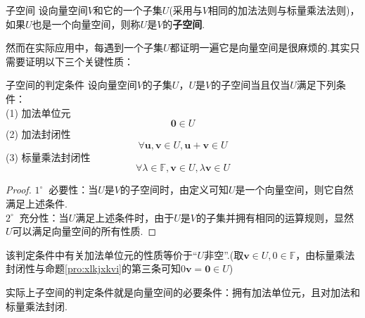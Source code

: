 \documentclass[lang=cn, zihao=5]{elegantbook}
\newcommand{\F}{\mathbb{F}}
\newcommand{\buzhou}[1]{$#1^{\circ} \ $}
\begin{document}
\begin{definition}{子空间}
    设向量空间$V$和它的一个子集$U$(采用与$V$相同的加法法则与标量乘法法则)，如果$U$也是一个向量空间，则称$U$是$V$的\textbf{子空间}.
\end{definition}

然而在实际应用中，每遇到一个子集$U$都证明一遍它是向量空间是很麻烦的.其实只需要证明以下三个关键性质：

\begin{proposition}{子空间的判定条件}
    设向量空间$V$的子集$U$，$U$是$V$的子空间当且仅当$U$满足下列条件： \\
    (1) 加法单位元$$\boldsymbol{0} \in U$$
    (2) 加法封闭性$$\forall \boldsymbol{u},\boldsymbol{v} \in U, \boldsymbol{u}+\boldsymbol{v} \in U$$
    (3) 标量乘法封闭性$$\forall \lambda \in \F,\boldsymbol{v} \in U,\lambda \boldsymbol{v} \in U$$
\end{proposition}
\begin{proof}
    \buzhou{1} 必要性：当$U$是$V$的子空间时，由定义可知$U$是一个向量空间，则它自然满足上述条件. \\
    \buzhou{2} 充分性：当$U$满足上述条件时，由于$U$是$V$的子集并拥有相同的运算规则，显然$U$可以满足向量空间的所有性质.
\end{proof}
\begin{remark}
    该判定条件中有关加法单位元的性质等价于“$U$非空”.(取$\boldsymbol{v} \in U,0 \in \F$，由标量乘法封闭性与命题\ref{pro:xlkjxkvi}的第三条可知$0\boldsymbol{v}=\boldsymbol{0} \in U$)
\end{remark}
\begin{remark}
    实际上子空间的判定条件就是向量空间的必要条件：拥有加法单位元，且对加法和标量乘法封闭.
\end{remark}
\end{document}
